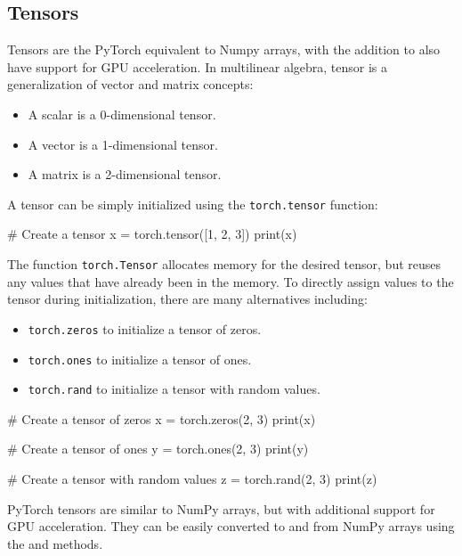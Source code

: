 \subsection*{Tensors}

Tensors are the PyTorch equivalent to Numpy arrays, with the addition to also have support for GPU acceleration.
In multilinear algebra, tensor is a generalization of vector and matrix concepts:
\begin{itemize}
    \item A scalar is a 0-dimensional tensor.
    \item A vector is a 1-dimensional tensor.
    \item A matrix is a 2-dimensional tensor.
\end{itemize}

A tensor can be simply initialized using the \texttt{torch.tensor} function:

\begin{codeblock}[language=python]
    # Create a tensor
    x = torch.tensor([1, 2, 3])
    print(x)
\end{codeblock}

The function \texttt{torch.Tensor} allocates memory for the desired tensor, but reuses any values that
have already been in the memory. To directly assign values to the tensor during initialization, there
are many alternatives including:
\begin{itemize}
    \item \texttt{torch.zeros} to initialize a tensor of zeros.
    \item \texttt{torch.ones} to initialize a tensor of ones.
    \item \texttt{torch.rand} to initialize a tensor with random values.
\end{itemize}

\begin{codeblock}[language=python]
    # Create a tensor of zeros
    x = torch.zeros(2, 3)
    print(x)

    # Create a tensor of ones
    y = torch.ones(2, 3)
    print(y)

    # Create a tensor with random values
    z = torch.rand(2, 3)
    print(z)
\end{codeblock}

\begin{observationblock}
    PyTorch tensors are similar to NumPy arrays, but with additional support for GPU acceleration. They can be easily converted to and from NumPy arrays using the  and  methods.
\end{observationblock}

